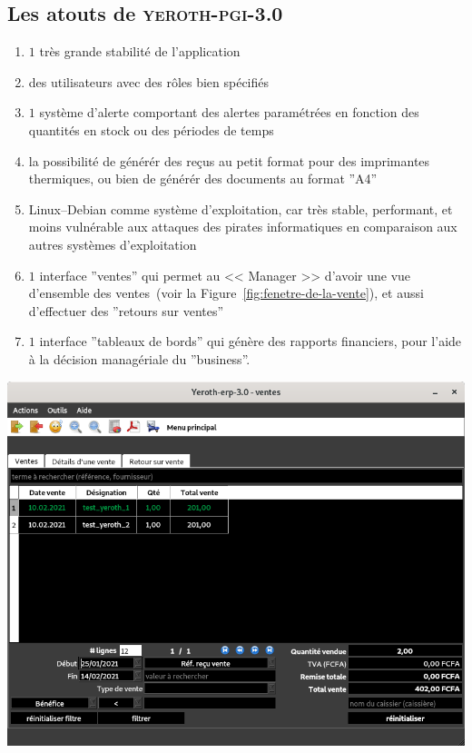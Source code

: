 \documentclass[a4paper, 10pt]{article}
\newcommand{\yeroth}{\textsc{yeroth-pgi-3.0}\xspace}
\newcommand{\manager}{<< Manager >>\xspace}
\begin{document}
\begin{multicols}{2}
\section{Les atouts de \yeroth}
\vspace{-0.3em}
\begin{enumerate}[1.]
	\itemsep -0.1em
	\item $1$ tr\`es grande stabilit\'e de l'application
	\item des utilisateurs avec des r\^oles bien sp\'ecifi\'es
	\item $1$ syst\`eme d'alerte comportant des alertes
	      param\'etr\'ees en fonction des quantit\'es en stock
	      ou des p\'eriodes de temps
	\item la possibilit\'e de g\'en\'er\'er des re\c{c}us au
	      petit format pour des imprimantes thermiques, ou bien
	      de g\'en\'er\'er des documents au format ''A4''
	\item Linux--Debian comme syst\`eme d'exploitation, car
	      tr\`es stable, performant, et moins vuln\'erable
	      aux attaques des pirates informatiques en comparaison
	      aux autres syst\`emes d'exploitation
	\item $1$ interface ''ventes'' qui permet au \manager
	      d'avoir une vue d'ensemble des 
	      ventes~(voir la Figure~\ref{fig:fenetre-de-la-vente}),
	      et aussi d'effectuer des ''retours sur ventes''
	\item $1$ interface ''tableaux de bords'' qui
		  g\'en\`ere des rapports financiers,
		  pour l'aide \`a la d\'ecision manag\'eriale
		  du ''business''.
\end{enumerate}

\begin{center}
\includegraphics[scale=0.32]{../images/yeren-fenetre-caisse.png}
\label{fig:fenetre-de-la-vente}
\end{center}



\end{multicols}
\end{document}
